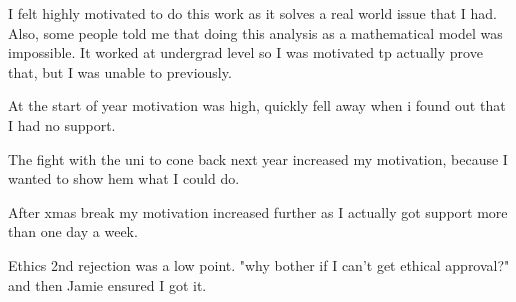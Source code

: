 I felt highly motivated to do this work as it solves a real world issue that I had. Also, some people told me that doing this analysis as a mathematical model was impossible. It worked at undergrad level so I was motivated tp actually prove that, but I was unable to previously.

At the start of year motivation was high, quickly fell away when i found out that I had no support.

The fight with the uni to cone back next year increased my motivation, because I wanted to show hem what I could do.

After xmas break my motivation increased further as I actually got support more than one day a week.

Ethics 2nd rejection was a low point. "why bother if I can't get ethical approval?" and then Jamie ensured I got it.
